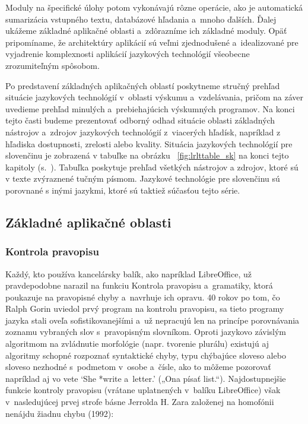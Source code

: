 \begin{multicols}{2}
Moduly na špecifické úlohy potom vykonávajú rôzne operácie, ako je
automatická sumarizácia vstupného textu, databázové hľadania
a~mnoho ďalších. Ďalej ukážeme základné aplikačné oblasti
a~zdôrazníme ich základné moduly. Opäť pripomíname,
že architektúry aplikácií sú veľmi zjednodušené a~idealizované
pre vyjadrenie komplexnosti aplikácií jazykových technológií
všeobecne zrozumiteľným spôsobom.

Po predstavení základných aplikačných oblastí poskytneme stručný prehľad
situácie jazykových technológií v~oblasti výskumu a~vzdelávania, pričom na
záver uvedieme prehľad minulých a~prebiehajúcich výskumných programov. Na konci
tejto časti budeme prezentovať odborný odhad situácie oblasti základných
nástrojov a~zdrojov jazykových technológií z~viacerých hľadísk, napríklad z
hľadiska dostupnosti, zrelosti alebo kvality. Situácia jazykových technológií
pre slovenčinu je zobrazená v tabuľke na obrázku ~\ref{fig:lrlttable_sk} na konci tejto
kapitoly (s.~\pageref{fig:lrlttable_sk}). Tabuľka poskytuje prehľad všetkých
nástrojov a zdrojov, ktoré sú v texte zvýraznené tučným písmom. Jazykové
technológie pre slovenčinu sú porovnané s inými jazykmi, ktoré sú taktiež
súčasťou tejto série. 

\subsection{Základné aplikačné oblasti}
\subsubsection{Kontrola pravopisu}
Každý, kto používa kancelársky balík, ako napríklad LibreOffice, už pravdepodobne narazil na funkciu Kontrola pravopisu a~gramatiky, ktorá poukazuje na pravopisné chyby a~navrhuje ich opravu. 40 rokov po tom, čo Ralph Gorin uviedol prvý program na kontrolu pravopisu, sa tieto programy jazyka stali oveľa sofistikovanejšími a~už nepracujú len na princípe porovnávania zoznamu vybraných slov s~pravopisným slovníkom. Oproti jazykovo závislým algoritmom na zvládnutie morfológie (napr. tvorenie plurálu) existujú aj algoritmy schopné rozpoznať syntaktické chyby, typu chýbajúce sloveso alebo sloveso nezhodné s~podmetom v~osobe a~čísle, ako to môžeme pozorovať napríklad aj vo vete ‘She *write a~letter.’ („Ona písať list.“). Najdostupnejšie funkcie kontroly pravopisu (vrátane uplatnených v~balíku LibreOffice) však v~nasledujúcej prvej strofe básne Jerrolda H. Zara založenej na homofónii nenájdu žiadnu chybu (1992)\cite{f22}:


\end{multicols}
